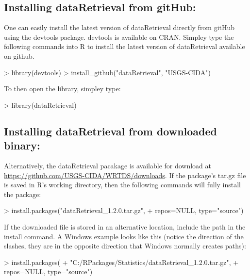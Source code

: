 \documentclass[a4paper,11pt]{article}
\begin{document}
\subsection{Installing dataRetrieval from gitHub:}
One can easily install the latest version of dataRetrieval directly from gitHub using the devtools package.  devtools is available on CRAN.  Simpley type the following commands into R to install the latest version of dataRetrieval available on github.  

\begin{Schunk}
\begin{Sinput}
> library(devtools)
> install_github("dataRetrieval", "USGS-CIDA")
\end{Sinput}
\end{Schunk}
To then open the library, simpley type:

\begin{Schunk}
\begin{Sinput}
> library(dataRetrieval)
\end{Sinput}
\end{Schunk}

\subsection{Installing dataRetrieval from downloaded binary:}
Alternatively, the dataRetrieval pacakage is available for download at \url{https://github.com/USGS-CIDA/WRTDS/downloads}.  If the package's tar.gz file is saved in R's working directory, then the following commands will fully install the package:

\begin{Schunk}
\begin{Sinput}
> install.packages("dataRetrieval_1.2.0.tar.gz", 
+                  repos=NULL, type="source")
\end{Sinput}
\end{Schunk}

If the downloaded file is stored in an alternative location, include the path in the install command.  A Windows example looks like this (notice the direction of the slashes, they are in the opposite direction that Windows normally creates paths):

\begin{Schunk}
\begin{Sinput}
> install.packages(
+   "C:/RPackages/Statistics/dataRetrieval_1.2.0.tar.gz", 
+   repos=NULL, type="source")
\end{Sinput}
\end{Schunk}
\end{document}
